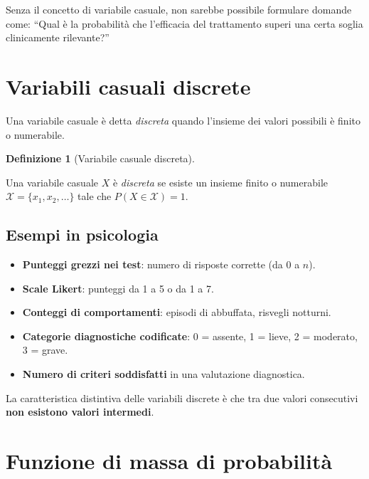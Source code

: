 \documentclass[
  italian,
  letterpaper,
  a4paper,
  11pt,
  open=any]{scrbook}
\providecommand{\tightlist}{%
  \setlength{\itemsep}{0pt}\setlength{\parskip}{0pt}}
\theoremstyle{plain}
\theoremstyle{definition}
\theoremstyle{definition}
\newtheorem{definition}{Definizione}[chapter]
\theoremstyle{remark}
\begin{document}
Senza il concetto di variabile casuale, non sarebbe possibile formulare
domande come: ``Qual è la probabilità che l'efficacia del trattamento
superi una certa soglia clinicamente rilevante?''

\section{Variabili casuali
discrete}\label{sec-discrete-random-variables}

Una variabile casuale è detta \emph{discreta} quando l'insieme dei
valori possibili è finito o numerabile.

\begin{definition}[Variabile casuale
discreta]\protect\hypertarget{def-discrete-rv}{}\label{def-discrete-rv}

Una variabile casuale \(X\) è \emph{discreta} se esiste un insieme
finito o numerabile \(\mathcal{X} = \{x_1, x_2, \ldots\}\) tale che
\(P(X \in \mathcal{X}) = 1\).

\end{definition}

\subsection{Esempi in psicologia}\label{esempi-in-psicologia}

\begin{itemize}
\tightlist
\item
  \textbf{Punteggi grezzi nei test}: numero di risposte corrette (da 0 a
  \(n\)).
\item
  \textbf{Scale Likert}: punteggi da 1 a 5 o da 1 a 7.
\item
  \textbf{Conteggi di comportamenti}: episodi di abbuffata, risvegli
  notturni.
\item
  \textbf{Categorie diagnostiche codificate}: 0 = assente, 1 = lieve, 2
  = moderato, 3 = grave.
\item
  \textbf{Numero di criteri soddisfatti} in una valutazione diagnostica.
\end{itemize}

La caratteristica distintiva delle variabili discrete è che tra due
valori consecutivi \textbf{non esistono valori intermedi}.

\section{Funzione di massa di probabilità}\label{sec-pmf}
\end{document}
